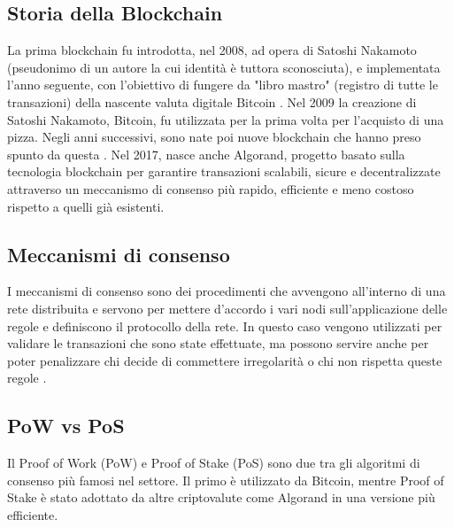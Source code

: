 \subsection{Storia della Blockchain}
La prima blockchain fu introdotta, nel 2008, ad opera di Satoshi Nakamoto (pseudonimo di un autore la cui identità è tuttora sconosciuta), e implementata l'anno seguente, con l'obiettivo di fungere da "libro mastro" (registro di tutte le transazioni) della nascente valuta digitale Bitcoin \cite{nakamoto2008bitcoin}. Nel 2009 la creazione di Satoshi Nakamoto, Bitcoin, fu utilizzata per la prima volta per l'acquisto di una pizza. Negli anni successivi, sono nate poi nuove blockchain che hanno preso spunto da questa \cite{blockchain}. Nel 2017, nasce anche Algorand, progetto basato sulla tecnologia blockchain per garantire transazioni scalabili, sicure e decentralizzate attraverso un meccanismo di consenso più rapido, efficiente e meno costoso rispetto a quelli già esistenti.

\subsection{Meccanismi di consenso}
I meccanismi di consenso sono dei procedimenti che avvengono all’interno di una rete distribuita e servono per mettere d’accordo i vari nodi sull’applicazione delle regole e definiscono il protocollo della rete. In questo caso vengono utilizzati per validare le transazioni che sono state effettuate, ma possono servire anche per poter penalizzare chi decide di commettere irregolarità o chi non rispetta queste regole \cite{8632190}.

\subsection{PoW vs PoS}
Il Proof of Work (PoW) e Proof of Stake (PoS) sono due tra gli algoritmi di consenso più famosi nel settore. Il primo è utilizzato da Bitcoin, mentre Proof of Stake è stato adottato da altre criptovalute come Algorand in una versione più efficiente.

